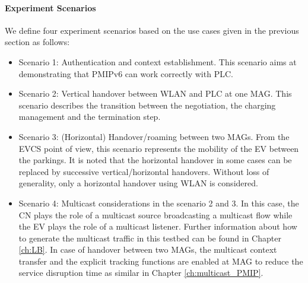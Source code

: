 \paragraph{Experiment Scenarios}
We define four experiment scenarios based on the use cases given in the previous section as follows:
\begin{itemize}
\itemsep 0.07em
\item Scenario 1: Authentication and context establishment. This scenario aims at demonstrating that PMIPv6 can work correctly with PLC.
\item Scenario 2: Vertical handover between WLAN and PLC at one MAG. This scenario describes the transition between the negotiation, the charging management and the termination step. 
\item Scenario 3: (Horizontal) Handover/roaming between two MAGs. From the EVCS point of view, this scenario represents the mobility of the EV between the parkings. It is noted that the horizontal handover in some cases can be replaced by successive vertical/horizontal handovers. Without loss of generality, only a horizontal handover using WLAN is considered.         
\item Scenario 4: Multicast considerations in the scenario 2 and 3. In this case, the CN plays the role of a multicast source broadcasting a multicast flow while the EV plays the role of a multicast listener. Further information about how to generate the multicast traffic in this testbed can be found in Chapter \ref{ch:LB}. In case of handover between two MAGs, the multicast context transfer and the explicit tracking functions are enabled at MAG to reduce the service disruption time as similar in Chapter \ref{ch:multicast_PMIP}.
\end{itemize}

